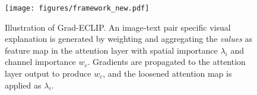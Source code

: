 \begin{figure}
	\begin{center}
		\texttt{[image: figures/framework\_new.pdf]}
	\end{center}
	\vspace{-0.3cm}
	\caption{Illustration of Grad-ECLIP. An image-text pair specific visual explanation is generated by weighting and aggregating the \textit{values} as feature map in the attention layer with spatial importance $\lambda_{i}$ and channel importance $w_{c}$. Gradients are propagated to the attention layer output to produce $w_{c}$, and the loosened attention map is applied as $\lambda_{i}$. 
	}
	\label{fig:framework}
	\vspace{-0.5cm}
\end{figure}


\vspace{-0.2cm}